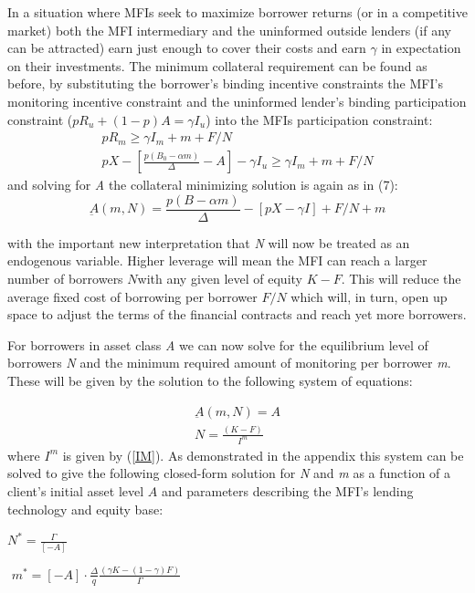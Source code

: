 \documentclass[letterpaper, 12pt]{article}
\begin{document}
In a situation where MFIs seek to maximize borrower returns (or in a
competitive market) both the MFI intermediary and the uninformed outside
lenders (if any can be attracted) earn just enough to cover their costs
and earn $\gamma$ in expectation on their investments. The minimum collateral
requirement can be found as before, by substituting the borrower's
binding incentive constraints the MFI's monitoring incentive constraint
and the uninformed lender's binding participation constraint
(\(pR_{u} + (1 - p)A = \gamma I_{u}\)) into the MFIs participation
constraint:
\begin{align*}
 pR_{m} \geq \gamma I_{m} + m + F/N  \\
 pX - \left\lbrack \frac{p(B_{0} - \alpha m)}{\Delta} - A \right\rbrack - \gamma I_{u} \geq \gamma I_{m} + m + F/N
\end{align*}
and solving for \emph{A} the collateral minimizing solution is again as
in (7):
\begin{equation}
 \underbar A (m,N) = \frac{p(B - \alpha m)}{\Delta} - \left\lbrack pX - \gamma I \right\rbrack + F/N + m
\end{equation}

with the important new interpretation that \emph{N} will now be treated
as an endogenous variable. Higher leverage will mean the MFI can reach a
larger number of borrowers \(N\)with any given level of equity
\(K - F\). This will reduce the average fixed cost of borrowing per
borrower \(F/N\) which will, in turn, open up space to adjust the terms
of the financial contracts and reach yet more borrowers.

For borrowers in asset class \emph{A} we can now solve for the
equilibrium level of borrowers \emph{N} and the minimum required amount
of monitoring per borrower \emph{m}. These will be given by the solution
to the following system of equations:

\begin{align}
  \underbar A(m,N) = A   \\
  N = \frac{(K - F)}{I^{m}}
\end{align}
where \(I^{m}\) is given by (\ref{IM}). As demonstrated in the appendix this
system can be solved to give the following closed-form solution for
\emph{N} and \emph{m} as a function of a client's initial asset level
\(A\) and parameters describing the MFI's lending technology and equity
base:

\(N^{*} = \frac{\Gamma}{\left\lbrack - A \right\rbrack}\mspace{6mu}\)

\(\mspace{6mu} m^{*} = \left\lbrack - A \right\rbrack \cdot \frac{\Delta}{q}\frac{(\gamma K - (1 - \gamma)F)}{\Gamma}\)
\end{document}
